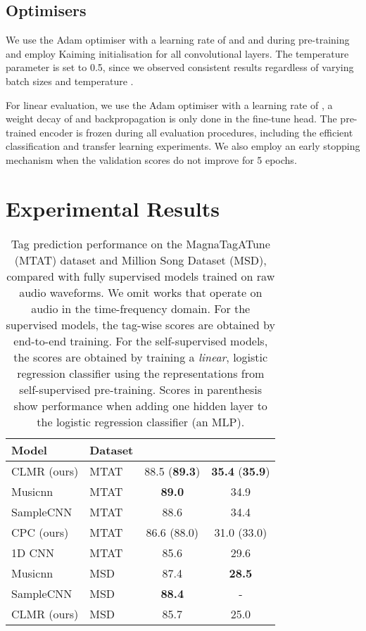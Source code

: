 \documentclass{article}
\begin{document}
\subsection{Optimisers}
We use the Adam optimiser \cite{adam_optimizer} with a learning rate of  and  and  during pre-training and employ Kaiming initialisation for all convolutional layers. The temperature parameter  is set to 0.5, since we observed consistent results regardless of varying batch sizes and temperature .

For linear evaluation, we use the Adam optimiser with a learning rate of , a weight decay of  and backpropagation is only done in the fine-tune head. The pre-trained encoder is frozen during all evaluation procedures, including the efficient classification and transfer learning experiments.
We also employ an early stopping mechanism when the validation scores do not improve for 5 epochs.

 \section{Experimental Results}\label{sec:results}

\begin{table}[t]
    \centering
    \begin{tabular}{@{}llcc@{}}\toprule
        Model & Dataset &  &  \\ \midrule
CLMR (ours) & MTAT & 88.5 (\textbf{89.3}) & \textbf{35.4} (\textbf{35.9}) \\
        Musicnn & MTAT & \textbf{89.0} & 34.9 \\
        SampleCNN & MTAT & 88.6 & 34.4 \\
        CPC (ours) & MTAT & 86.6 (88.0) & 31.0 (33.0) \\
        1D CNN & MTAT & 85.6 & 29.6 \\\midrule
        Musicnn & MSD & 87.4 & \textbf{28.5} \\
        SampleCNN & MSD & \textbf{88.4} & - \\
        CLMR (ours) & MSD & 85.7 & 25.0 \\
        \bottomrule
    \end{tabular}
    \caption{Tag prediction performance on the Magna\-Tag\-A\-Tune (MTAT) dataset and Million Song Dataset (MSD), compared with fully supervised models trained on raw audio waveforms.
    We omit works that operate on audio in the time-frequency domain.
For the supervised models, the tag-wise scores are obtained by end-to-end training.
For the self-supervised models, the scores are obtained by training a \emph{linear}, logistic regression classifier using the representations from self-supervised pre-training.
Scores in parenthesis show performance when adding one hidden layer to the logistic regression classifier (an MLP).}
    \label{tab:results}
\end{table}
\end{document}
